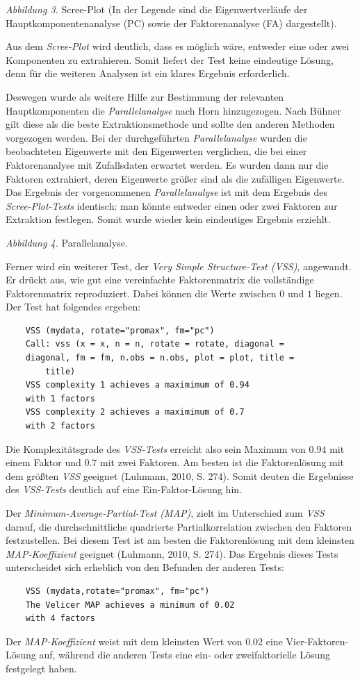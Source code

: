 \documentclass[12pt,a4paper]{article}
\begin{document}
\textit{Abbildung 3.} Scree-Plot (In der Legende sind die Eigenwertverläufe der Hauptkomponentenanalyse (PC) sowie der Faktorenanalyse (FA) dargestellt).

									
Aus dem \textit{Scree-Plot} wird deutlich, dass es möglich wäre, entweder eine oder zwei Komponenten zu extrahieren. Somit liefert der Test keine eindeutige Lösung, denn für die weiteren Analysen ist ein klares Ergebnis erforderlich.

	Deswegen wurde als weitere Hilfe zur Bestimmung der relevanten Hauptkomponenten die \textit{Parallelanalyse} nach Horn hinzugezogen. Nach Bühner gilt diese als die beste Extraktionsmethode und sollte den anderen Methoden vorgezogen werden. Bei der durchgeführten \textit{Parallelanalyse} wurden die beobachteten Eigenwerte mit den Eigenwerten verglichen, die bei einer Faktorenanalyse mit Zufallsdaten erwartet werden. Es wurden dann nur die Faktoren extrahiert, deren Eigenwerte größer sind als die zufälligen Eigenwerte. Das Ergebnis der vorgenommenen \textit{Parallelanalyse} ist mit dem Ergebnis des \textit{Scree-Plot-Tests} identisch: man könnte entweder einen oder zwei Faktoren zur Extraktion festlegen. Somit wurde wieder kein eindeutiges Ergebnis erziehlt.

\textit{Abbildung 4.} Parallelanalyse.

Ferner wird ein weiterer Test, der \textit{Very Simple Structure-Test (VSS)}, angewandt. Er drückt aus, wie gut eine vereinfachte Faktorenmatrix die vollständige Faktorenmatrix reproduziert. Dabei können die Werte zwischen $0$ und $1$ liegen. Der Test hat folgendes ergeben:
\begin{verbatim}
	VSS (mydata, rotate="promax", fm="pc")
	Call: vss (x = x, n = n, rotate = rotate, diagonal = 
	diagonal, fm = fm, n.obs = n.obs, plot = plot, title = 
		title)
	VSS complexity 1 achieves a maximimum of 0.94 
	with 1 factors
	VSS complexity 2 achieves a maximimum of 0.7 
	with 2 factors
	\end{verbatim}
\noindent Die Komplexitätsgrade des \textit{VSS-Tests} erreicht also sein Maximum von $0.94$ mit einem Faktor und $0.7$ mit zwei Faktoren. Am besten ist die Faktorenlösung mit dem größten \textit{VSS} geeignet (Luhmann, 2010, S. 274). Somit deuten die Ergebnisse des \textit{VSS-Tests} deutlich auf eine Ein-Faktor-Lösung hin.

	Der \textit{Minimum-Average-Partial-Test (MAP)}, zielt im Unterschied zum \textit{VSS} darauf, die durchschnittliche quadrierte Partialkorrelation zwischen den Faktoren festzustellen.  Bei diesem Test ist am besten die Faktorenlösung mit dem kleinsten \textit{MAP-Koeffizient} geeignet (Luhmann, 2010, S. 274). Das Ergebnis dieses Tests unterscheidet sich erheblich von den Befunden der anderen Tests:
	\begin{verbatim}
	VSS (mydata,rotate="promax", fm="pc")
	The Velicer MAP achieves a minimum of 0.02 
	with 4 factors
	\end{verbatim}
\noindent Der \textit{MAP-Koeffizient} weist mit dem kleinsten Wert von $0.02$ eine Vier-Faktoren-Lösung auf, während die anderen Tests eine ein- oder zweifaktorielle Lösung festgelegt haben.
\end{document}

